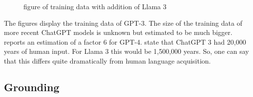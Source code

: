 \begin{figure}
{}
\caption{ figure of training data with addition of Llama 3}\label{fig-training-data-llama3}
\end{figure}
The figures display the training data of GPT-3. The size of the training data of more recent ChatGPT models is unknown but estimated to be much
bigger. \citet[6]{Lappin2024a} reports an estimation of a factor 6 for GPT-4. \citet{WB2022a} state that ChatGPT 3 had 20,000 years of human
input. For Llama 3 this would be 1,500,000 years. So, one can say that this differs quite dramatically from
human language acquisition.

\subsection{Grounding}

